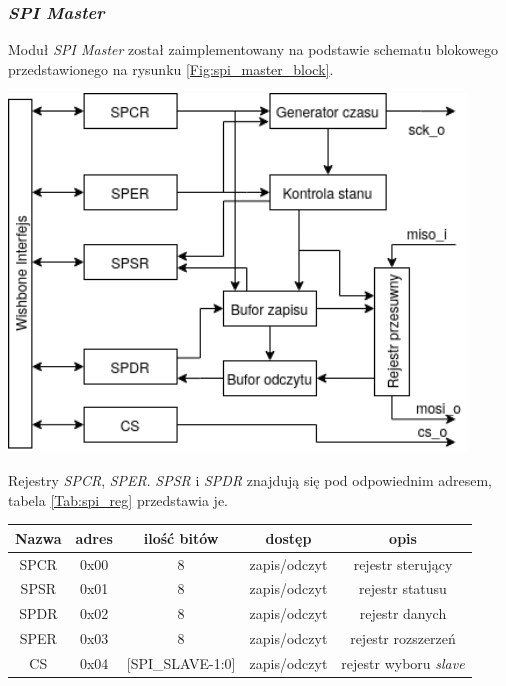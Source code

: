 \documentclass[11pt,a4paper]{article}
\begin{document}
		\subsubsection{\textit{SPI Master}}
		\hspace{5mm} Moduł \textit{SPI Master} został zaimplementowany na podstawie schematu blokowego przedstawionego na rysunku \ref{Fig:spi_master_block}.\\
					\begin{minipage}[c]{\textwidth}
					\includegraphics[width=\textwidth,height=9.5cm]{./rysunki/spi_arch.png}
			\end{minipage} 
		Rejestry \textit{SPCR}, \textit{SPER}. \textit{SPSR} i \textit{SPDR} znajdują się pod odpowiednim adresem, tabela \ref{Tab:spi_reg} przedstawia je.
		\\
 \begin{minipage}{\textwidth}
		 \begin{center}
				\begin{tabular}{|c|c|c|c|c|}
					\hline
					Nazwa & adres & ilość bitów & dostęp & opis \\ 
					\hline
					SPCR & 0x00 & 8 & zapis/odczyt & rejestr sterujący \\
					\hline
					SPSR & 0x01 & 8 &zapis/odczyt & rejestr statusu \\
					\hline
					SPDR & 0x02 & 8 &zapis/odczyt & rejestr danych\\
					\hline
					SPER & 0x03 & 8 &zapis/odczyt & rejestr rozszerzeń\\
					\hline
					CS & 0x04 & [SPI\_SLAVE-1:0] & zapis/odczyt & rejestr wyboru \textit{slave} \\
					\hline
					
				\end{tabular}
		\end{center}
		\end{minipage}	
\end{document}
